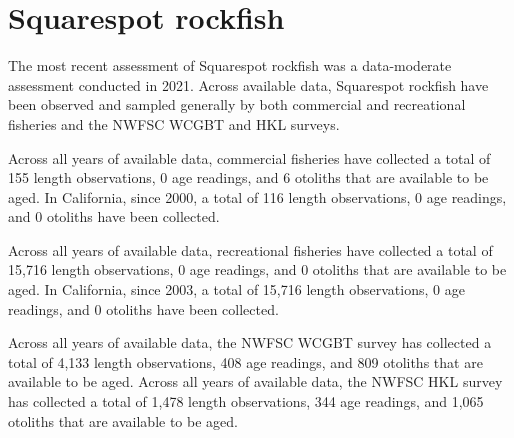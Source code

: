 \documentclass[11pt,
  english,
  letterpaper,
]{article}
\begin{document}

\hypertarget{squarespot-rockfish}{%
\section{Squarespot rockfish}\label{squarespot-rockfish}}

\leavevmode\tagmcend\tagstructend


The most recent assessment of Squarespot rockfish was a data-moderate assessment conducted in 2021. Across available data, Squarespot rockfish have been observed and sampled generally by both commercial and recreational fisheries and the NWFSC WCGBT and HKL surveys.

\leavevmode\tagmcend\tagstructend\par


Across all years of available data, commercial fisheries have collected a total of 155 length observations, 0 age readings, and 6 otoliths that are available to be aged. In California, since 2000, a total of 116 length observations, 0 age readings, and 0 otoliths have been collected.

\leavevmode\tagmcend\tagstructend\par


Across all years of available data, recreational fisheries have collected a total of 15,716 length observations, 0 age readings, and 0 otoliths that are available to be aged. In California, since 2003, a total of 15,716 length observations, 0 age readings, and 0 otoliths have been collected.

\leavevmode\tagmcend\tagstructend\par


Across all years of available data, the NWFSC WCGBT survey has collected a total of 4,133 length observations, 408 age readings, and 809 otoliths that are available to be aged. Across all years of available data, the NWFSC HKL survey has collected a total of 1,478 length observations, 344 age readings, and 1,065 otoliths that are available to be aged.

\leavevmode\tagmcend\tagstructend\par
\end{document}
